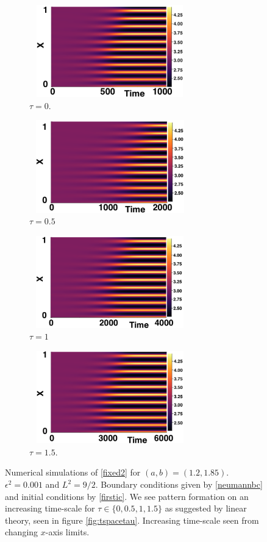 \begin{figure}[H]
    \centering
    \begin{subfigure}[t]{0.45\textwidth}
        \centering
        \includegraphics[width=7cm,height=4cm]{p2t0.png}
        \caption{$\tau=0$.}
        \label{}
    \end{subfigure}
    \hfill
    \begin{subfigure}[t]{0.45\textwidth}
        \centering
        \includegraphics[width=7cm,height=4cm]{p2t05.png}
        \caption{$\tau=0.5$}
        \label{}
    \end{subfigure}
    \hfill
    \begin{subfigure}[t]{0.45\textwidth}
        \centering
        \includegraphics[width=7cm,height=4cm]{p2t1.png}
        \caption{$\tau=1$}
        \label{}
    \end{subfigure}
    \hfill
    \begin{subfigure}[t]{0.45\textwidth}
        \centering
        \includegraphics[width=7cm,height=4cm]{p2t15.png}
        \caption{$\tau=1.5$.}
        \label{}
    \end{subfigure}
    \caption{Numerical simulations of \eqref{fixed2} for $(a,b)=(1.2,1.85)$. $\epsilon^2=0.001$ and $L^2=9/2$. Boundary conditions given by \eqref{neumannbc} and initial conditions by \eqref{firstic}. We see pattern formation on an increasing time-scale for $\tau\in\{0,0.5,1,1.5\}$ as suggested by linear theory, seen in figure \ref{fig:tspacetau}. Increasing time-scale seen from changing $x$-axis limits.}
    \label{fig:testturing3}
\end{figure}

